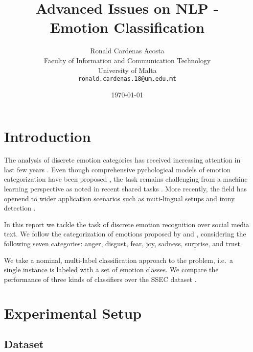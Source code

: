 \documentclass[11pt,a4paper]{article}
\title{Advanced Issues on NLP - Emotion Classification}
\author{Ronald Cardenas Acosta\\
  Faculty of Information and Communication Technology \\
  University of Malta \\
  {\tt ronald.cardenas.18@um.edu.mt} \\}
\date{\today}
\begin{document}
\maketitle

\section{Introduction}

The analysis of discrete emotion categories has received increasing attention in last few years \cite{alm2005emotions,aman2007identifying,dodds2011temporal}.
Even though comprehensive pychological models of emotion categorization have been proposed \cite{ekman1999basic, plutchik2001nature}, the task remains challenging from a machine learning perspective as noted in recent shared tasks \cite{mohammad2016semeval}. More recently, the field has openend to wider application scenarios such as muti-lingual setups \cite{barbieri2018semeval} and irony detection \cite{van2018semeval}.

In this report we tackle the task of discrete emotion recognition over social media text.
We follow the categorization of emotions proposed by \citet{ekman1999basic} and \citet{plutchik2001nature}, considering the following seven categories:
anger, disgust, fear, joy, sadness, surprise, and trust.

We take a nominal, multi-label classification approach to the problem, i.e.\ a single instance is labeled with a set of emotion classes.
We compare the performance of three kinds of classifiers over the SSEC dataset \cite{schuff2017annotation}.

%
%


\section{Experimental Setup}

\subsection{Dataset}
\end{document}
